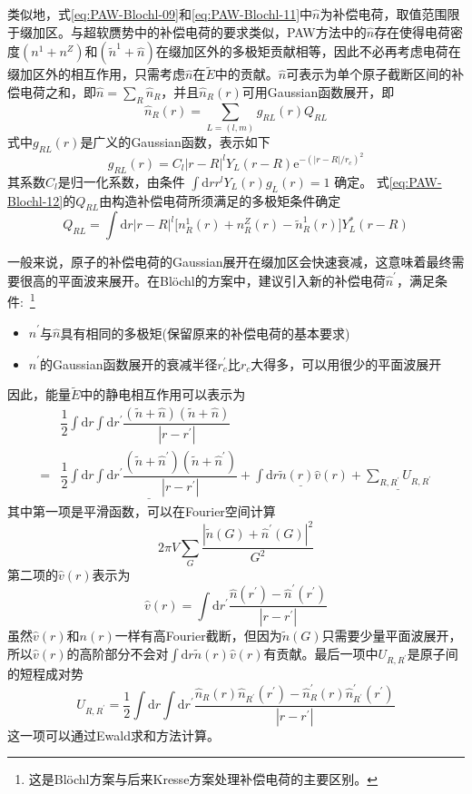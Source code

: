 类似地，式\eqref{eq:PAW-Blochl-09}和\eqref{eq:PAW-Blochl-11}中$\hat n$为补偿电荷，取值范围限于缀加区。与超软赝势中的补偿电荷的要求类似，\textrm{PAW}方法中的$\hat n$存在使得电荷密度$(n^1+n^Z)$和$(\tilde n^1+\hat n)$在缀加区外的多极矩贡献相等，因此不必再考虑电荷在缀加区外的相互作用，只需考虑$\hat n$在$\tilde E$中的贡献。$\hat n$可表示为单个原子截断区间的补偿电荷之和，即$\hat n=\sum_R\hat n_R$，并且$\hat n_R(r)$可用\textrm{Gaussian}函数展开，即
\begin{equation}
	\hat n_R(r)=\sum_{L=(l,m)}g_{RL}(r)Q_{RL}
	\label{eq:PAW-Blochl-12}
\end{equation}
式中$g_{RL}(r)$是广义的\textrm{Gaussian}函数，表示如下
	$$g_{RL}(r)=C_l|r-R|^lY_L(r-R)\mathrm{e}^{-(|r-R|/r_c)^2}$$
其系数$C_l$是归一化系数，由条件
	$\int\mathrm{d}rr^lY_L(r)g_L(r)=1$
确定。
式\eqref{eq:PAW-Blochl-12}的$Q_{RL}$由构造补偿电荷所须满足的多极矩条件确定
	$$Q_{RL}=\int\mathrm{d}r|r-R|^l\big[n_R^1(r)+n_R^Z(r)-\tilde n_R^1(r)\big]Y_L^{\ast}(r-R)$$

一般来说，原子的补偿电荷的\textrm{Gaussian}展开在缀加区会快速衰减，这意味着最终需要很高的平面波来展开。在\textrm{Bl\"ochl}的方案中，建议引入新的补偿电荷$\hat n^{\prime}$，满足条件:~\footnote{这是\textrm{Bl\"ochl}方案与后来\textrm{Kresse}方案处理补偿电荷的主要区别。}
	\begin{itemize}
		\item $\hat n^{\prime}$与$\hat n$具有相同的多极矩(保留原来的补偿电荷的基本要求)
		\item $\hat n^{\prime}$的\textrm{Gaussian}函数展开的衰减半径$r_c^{\prime}$比$r_c$大得多，可以用很少的平面波展开
	\end{itemize}
因此，能量$\tilde E$中的静电相互作用可以表示为
	\begin{equation}
		\begin{aligned}
			&\dfrac12\int\mathrm{d}r\int\mathrm{d}r^{\prime}\dfrac{(\tilde n+\hat n)(\tilde n+\hat n)}{|r-r^{\prime}|}\\
			=&\underline{\dfrac12\int\mathrm{d}r\int\mathrm{d}r^{\prime}\dfrac{(\tilde n+\hat n^{\prime})(\tilde n+\hat n^{\prime})}{|r-r^{\prime}|}}
			+\underline{\int\mathrm{d}r\tilde n(r)\hat v(r)}+\underline{\sum_{R,R^{\prime}}U_{R,R^{\prime}}}
		\end{aligned}
		\label{eq:PAW-Blochl-13}
	\end{equation}
其中第一项是平滑函数，可以在\textrm{Fourier}空间计算
	$$2\pi V\sum_G\dfrac{|\tilde n(G)+\hat n^{\prime}(G)|^2}{G^2}$$
第二项的$\hat v(r)$表示为
	$$\hat v(r)=\int\mathrm{d}r^{\prime}\dfrac{\hat n(r^{\prime})-\hat n^{\prime}(r^{\prime})}{|r-r^{\prime}|}$$
虽然$\hat v(r)$和$n(r)$一样有高\textrm{Fourier}截断，但因为$\tilde n(G)$只需要少量平面波展开，所以$\hat v(r)$的高阶部分不会对$\int\mathrm{d}r\tilde n(r)\hat v(r)$有贡献。最后一项中$U_{R,R^{\prime}}$是原子间的短程成对势
	$$U_{R,R^{\prime}}=\dfrac12\int\mathrm{d}r\int\mathrm{d}r^{\prime}\dfrac{\hat n_R(r)\hat n_{R^{\prime}}(r^{\prime})-\hat n_R^{\prime}(r)\hat n_{R^{\prime}}^{\prime}(r^{\prime})}{|r-r^{\prime}|}$$
这一项可以通过\textrm{Ewald}求和方法计算。

